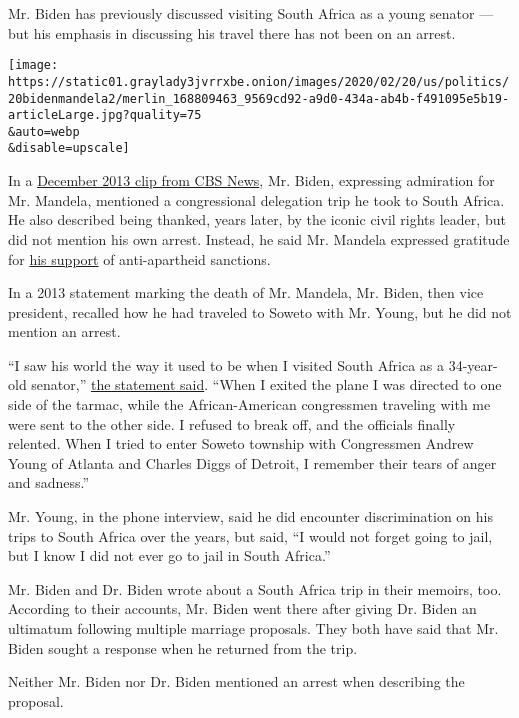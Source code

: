 Mr. Biden has previously discussed visiting South Africa as a young
senator --- but his emphasis in discussing his travel there has not been
on an arrest.

\texttt{[image: https://static01.graylady3jvrrxbe.onion/images/2020/02/20/us/politics/20bidenmandela2/merlin\_168809463\_9569cd92-a9d0-434a-ab4b-f491095e5b19-articleLarge.jpg?quality=75\\\&auto=webp\\\&disable=upscale]}

In a
\href{https://www.cbsnews.com/video/biden-signs-condolence-book-for-nelson-mandela/}{December
2013 clip from CBS News}, Mr. Biden, expressing admiration for Mr.
Mandela, mentioned a congressional delegation trip he took to South
Africa. He also described being thanked, years later, by the iconic
civil rights leader, but did not mention his own arrest. Instead, he
said Mr. Mandela expressed gratitude for
\href{https://www.chicagotribune.com/news/ct-xpm-1986-07-24-8602230193-story.html}{his
support} of anti-apartheid sanctions.

In a 2013 statement marking the death of Mr. Mandela, Mr. Biden, then
vice president, recalled how he had traveled to Soweto with Mr. Young,
but he did not mention an arrest.

``I saw his world the way it used to be when I visited South Africa as a
34-year-old senator,''
\href{https://obamawhitehouse.archives.gov/the-press-office/2013/12/05/statement-vice-president-death-nelson-mandela}{the
statement said}. ``When I exited the plane I was directed to one side of
the tarmac, while the African-American congressmen traveling with me
were sent to the other side. I refused to break off, and the officials
finally relented. When I tried to enter Soweto township with Congressmen
Andrew Young of Atlanta and Charles Diggs of Detroit, I remember their
tears of anger and sadness.''

Mr. Young, in the phone interview, said he did encounter discrimination
on his trips to South Africa over the years, but said, ``I would not
forget going to jail, but I know I did not ever go to jail in South
Africa.''

Mr. Biden and Dr. Biden wrote about a South Africa trip in their
memoirs, too. According to their accounts, Mr. Biden went there after
giving Dr. Biden an ultimatum following multiple marriage proposals.
They both have said that Mr. Biden sought a response when he returned
from the trip.

Neither Mr. Biden nor Dr. Biden mentioned an arrest when describing the
proposal.

